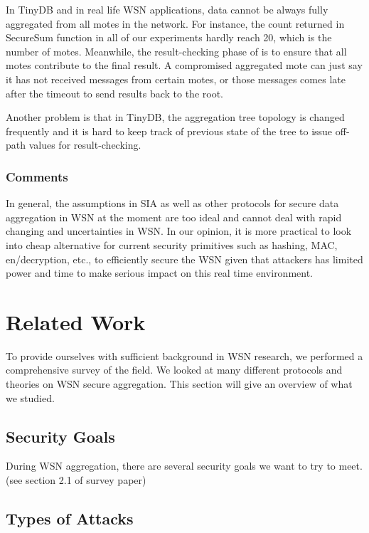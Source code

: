 \documentclass[a4paper]{article}
\begin{document}
In TinyDB and in real life WSN applications, data cannot be always fully aggregated
from all motes in the network. For instance, the count returned in SecureSum function 
in all of our experiments hardly reach 20, which is the number of motes. Meanwhile,
the result-checking phase of \cite{Chan06} is to ensure that all motes contribute
to the final result. A compromised aggregated mote can just say it has not received
messages from certain motes, or those messages comes late after the timeout to
send results back to the root. 

Another problem is that in TinyDB, the aggregation tree topology is changed 
frequently and it is hard to keep track of previous state of the tree to issue
off-path values for result-checking.

\subsubsection{Comments}

In general, the assumptions in SIA as well as other protocols for secure data aggregation
in WSN at the moment are too ideal and cannot deal with rapid changing and uncertainties
in WSN. In our opinion, it is more practical to look into cheap alternative for current
security primitives such as hashing, MAC, en/decryption, etc., to efficiently secure
the WSN given that attackers has limited power and time to make serious impact
on this real time environment. 

\section{Related Work}
\label{sec:relatedwork}

To provide ourselves with sufficient background in WSN research, we performed
a comprehensive survey of the field. We looked at many different protocols and
theories on WSN secure aggregation. This section will give an overview of what
we studied.

\subsection{Security Goals}

During WSN aggregation, there are several security goals we want to try to
meet. (see section 2.1 of survey paper)

\subsection{Types of Attacks}
\end{document}
